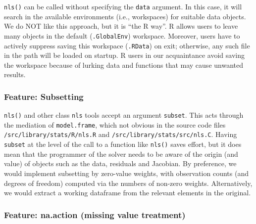 \documentclass[
]{article}
\begin{document}
\texttt{nls()} can be called without specifying the \texttt{data}
argument. In this case, it will search in the available environments
(i.e., workspaces) for suitable data objects. We do NOT like this
approach, but it is ``the R way''. R allows users to leave many objects
in the default (\texttt{.GlobalEnv}) workspace. Moreover, users have to
actively suppress saving this workspace (\texttt{.RData}) on exit;
otherwise, any such file in the path will be loaded on startup. R users
in our acquaintance avoid saving the workspace because of lurking data
and functions that may cause unwanted results.

\hypertarget{feature-subsetting}{%
\subsubsection{Feature: Subsetting}\label{feature-subsetting}}

\texttt{nls()} and other class \texttt{nls} tools accept an argument
\texttt{subset}. This acts through the mediation of
\texttt{model.frame}, which not obvious in the source code files
\texttt{/src/library/stats/R/nls.R} and
\texttt{/src/library/stats/src/nls.C}. Having \texttt{subset} at the
level of the call to a function like \texttt{nls()} saves effort, but it
does mean that the programmer of the solver needs to be aware of the
origin (and value) of objects such as the data, residuals and Jacobian.
By preference, we would implement subsetting by zero-value weights, with
observation counts (and degrees of freedom) computed via the numbers of
non-zero weights. Alternatively, we would extract a working dataframe
from the relevant elements in the original.

\hypertarget{feature-na.action-missing-value-treatment}{%
\subsubsection{Feature: na.action (missing value
treatment)}\label{feature-na.action-missing-value-treatment}}
\end{document}
